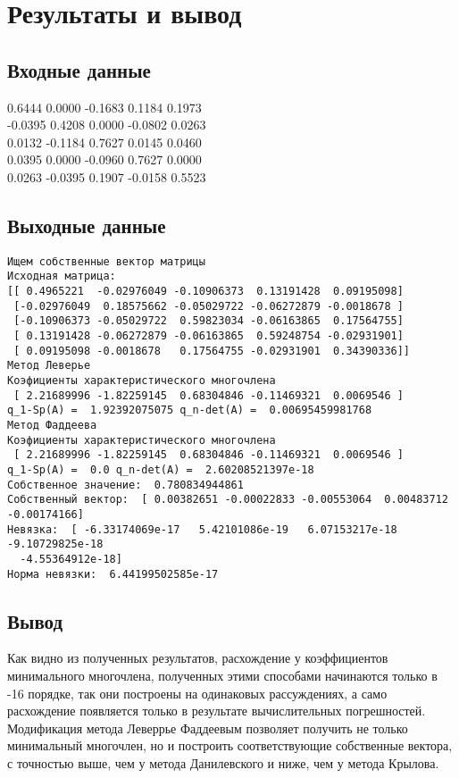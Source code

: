 \documentclass[11.4pt]{article}
\begin{document}
\section{Результаты и вывод}
	\subsection{Входные данные}
		0.6444 0.0000 -0.1683 0.1184 0.1973\\
		-0.0395 0.4208 0.0000 -0.0802 0.0263\\
		0.0132 -0.1184 0.7627 0.0145 0.0460\\
		0.0395 0.0000 -0.0960 0.7627 0.0000\\
		0.0263 -0.0395 0.1907 -0.0158 0.5523\\
	\subsection{Выходные данные}
\begin{verbatim}
Ищем собственные вектор матрицы
Исходная матрица:
[[ 0.4965221  -0.02976049 -0.10906373  0.13191428  0.09195098]
 [-0.02976049  0.18575662 -0.05029722 -0.06272879 -0.0018678 ]
 [-0.10906373 -0.05029722  0.59823034 -0.06163865  0.17564755]
 [ 0.13191428 -0.06272879 -0.06163865  0.59248754 -0.02931901]
 [ 0.09195098 -0.0018678   0.17564755 -0.02931901  0.34390336]]
Метод Леверье
Коэфициенты характеристического многочлена
 [ 2.21689996 -1.82259145  0.68304846 -0.11469321  0.0069546 ]
q_1-Sp(A) =  1.92392075075 q_n-det(A) =  0.00695459981768
Метод Фаддеева
Коэфициенты характеристического многочлена
 [ 2.21689996 -1.82259145  0.68304846 -0.11469321  0.0069546 ]
q_1-Sp(A) =  0.0 q_n-det(A) =  2.60208521397e-18
Собственное значение:  0.780834944861
Собственный вектор:  [ 0.00382651 -0.00022833 -0.00553064  0.00483712 -0.00174166]
Невязка:  [ -6.33174069e-17   5.42101086e-19   6.07153217e-18  -9.10729825e-18
  -4.55364912e-18]
Норма невязки:  6.44199502585e-17

 \end{verbatim}
	\subsection{Вывод}
Как видно из полученных результатов, расхождение у коэффициентов минимального многочлена, полученных этими способами начинаются только в -16 порядке, так они построены на одинаковых рассуждениях, а само расхождение появляется только в результате вычислительных погрешностей. Модификация метода Леверрье Фаддеевым позволяет получить не только минимальный многочлен, но и построить соответствующие собственные вектора, с точностью выше, чем у метода Данилевского и ниже, чем у метода Крылова.
\newpage
\end{document}
